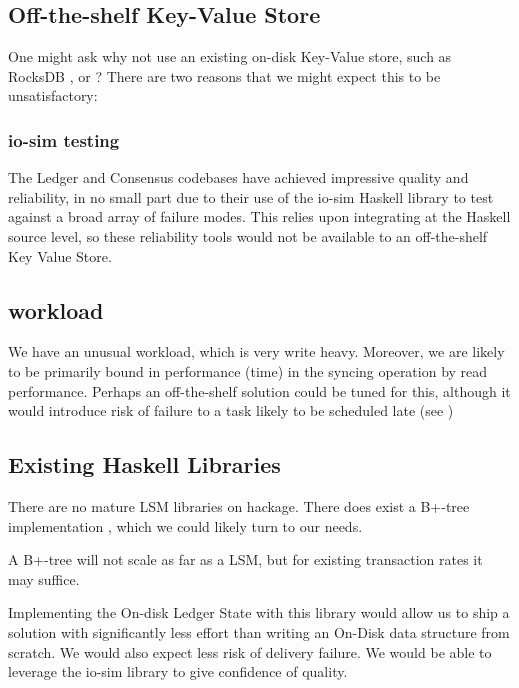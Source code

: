 \documentclass[11pt,a4paper]{article}
\begin{document}
\subsection{Off-the-shelf Key-Value Store}


One might ask why not use an existing on-disk Key-Value store, such as
RocksDB , or ? There are two
reasons that we might expect this to be unsatisfactory:

\subsubsection{io-sim testing}
The Ledger and Consensus codebases have achieved impressive quality
and reliability, in no small part due to their use of the io-sim
Haskell library to test against a broad array of failure modes. This
relies upon integrating at the Haskell source level, so these
reliability tools would not be available to an off-the-shelf Key Value
Store.

\subsection{workload}
We have an unusual workload, which is very write heavy. Moreover, we are likely
to be primarily bound in performance (time) in the syncing operation by read
performance. Perhaps an off-the-shelf solution could be tuned for this, although
it would introduce risk of failure to a task likely to be scheduled late (see )

\subsection{Existing Haskell Libraries}

There are no mature LSM libraries on hackage. There does exist a B+-tree
implementation ,
which we could likely turn to our needs.

A B+-tree will not scale as far as a LSM, but for existing transaction rates it
may suffice.

Implementing the On-disk Ledger State with this library would allow us to ship a
solution with significantly less effort than writing an On-Disk data structure
from scratch. We would also expect less risk of delivery failure. We would be
able to leverage the io-sim library to give confidence of quality.
\end{document}
